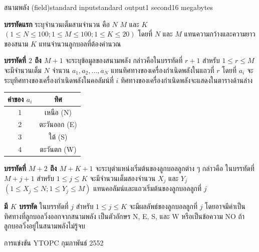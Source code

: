 \documentclass[11pt,a4paper]{article}
\begin{document}
\begin{problem}{สนามพลัง (field)}{standard input}{standard output}{1 second}{16 megabytes}
\InputFile

\textbf{บรรทัดแรก} ระบุจำนวนเต็มสามจำนวน คือ $N$ $M$ และ $K$ $(1 \leq N \leq 100; 1 \leq M \leq 100; 1\leq K\leq 20)$ โดยที่ $N$ และ $M$ แทนความกว้างและความยาวของสนาม $K$ แทนจำนวนลูกบอลที่ต้องคำนวณ

\textbf{บรรทัดที่ $2$ ถึง $M+1$} จะระบุข้อมูลของสนามพลัง กล่าวคือในบรรทัดที่ $r+1$ สำหรับ $1 \leq r \leq M$ จะมีจำนวนเต็ม $N$ จำนวน $a_1, a_2, ..., a_N$ แทนทิศทางของเครื่องกำเนิดพลังในแถวที่ $r$ โดยที่ $a_i$ จะระบุทิศทางของเครื่องกำเนิดพลังในคอลัมน์ที่ $i$ ทิศทางของเครื่องกำเนิดพลังจะแสดงในตารางด้านล่าง

\begin{center}
\begin{tabular}{|c|c|}
\hline
ค่าของ $a_i$ & ทิศ\\
\hline
1 & เหนือ (N)\\
\hline
2 & ตะวันออก (E)\\
\hline
3 & ใต้ (S)\\
\hline
4 & ตะวันตก (W)\\
\hline
\end{tabular}
\end{center}

\textbf{บรรทัดที่ $M+2$ ถึง $M+K+1$ }จะระบุตำแหน่งเริ่มต้นของลูกบอลลูกต่าง ๆ กล่าวคือ ในบรรทัดที่ $M + j +1$ สำหรับ $1 \leq j \leq K $ จะมีจำนวนเต็มสองจำนวน $X_j$ และ $Y_j$ $(1 \leq X_j \leq N; 1 \leq Y_j \leq M)$ แทนคอลัมน์และแถวเริ่มต้นของลูกบอลลูกที่ $j$

\OutputFile

\textbf{มี $K$ บรรทัด} ในบรรทัดที่ $j$ สำหรับ $1 \leq j \leq K$ จะมีผลลัพธ์ของลูกบอลลูกที่ $j$ โดยอาจมีค่าเป็นทิศทางที่ลูกบอลวิ่งออกจากสนามพลัง เป็นตัวอักษร N, E, S, และ W หรือเป็นข้อความ NO ถ้าลูกบอลวิ่งอยู่ในสนามพลังไม่รู้จบ


\Examples

\begin{example}
%
%
\end{example}


\Source

การแข่งขัน YTOPC กุมภาพันธ์ 2552


\end{problem}
\end{document}
